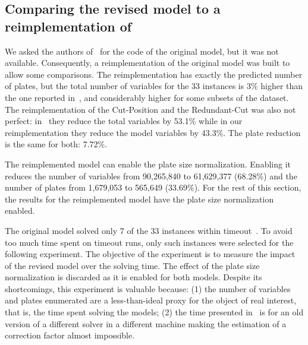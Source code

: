 \documentclass[smallextended]{svjour3}       %
\begin{document}

\subsection{Comparing the revised model to a reimplementation of~\cite{furini:2016}}

We asked the authors of~\cite{furini:2016} for the code of the original model, but it was not available.
Consequently, a reimplementation of the original model was built to allow some comparisons.
The reimplementation has exactly the predicted number of plates, but the total number of variables for the 33 instances is 3\% higher than the one reported in~\cite{furini:2016}, and considerably higher for some subsets of the dataset.
The reimplementation of the Cut-Position and the Redundant-Cut was also not perfect: in~\cite{dimitri_thesis} they reduce the total variables by 53.1\% while in our reimplementation they reduce the model variables by 43.3\%.
The plate reduction is the same for both: 7.72\%.

The reimplemented model can enable the plate size normalization.
Enabling it reduces the number of variables from 90,265,840 to 61,629,377 (68.28\%) and the number of plates from 1,679,053 to 565,649 (33.69\%).
For the rest of this section, the results for the reimplemented model have the plate size normalization enabled.

The original model solved only 7 of the 33 instances within timeout~\cite{furini:2,016}.
To avoid too much time spent on timeout runs, only such instances were selected for the following experiment.
The objective of the experiment is to measure the impact of the revised model over the solving time.
The effect of the plate size normalization is discarded as it is enabled for both models.
Despite its shortcomings, this experiment is valuable because: (1) the number of variables and plates enumerated are a less-than-ideal proxy for the object of real interest, that is, the time spent solving the models; (2) the time presented in~\cite{furini:2,016} is for an old version of a different solver in a different machine making the estimation of a correction factor almost impossible.
\end{document}
